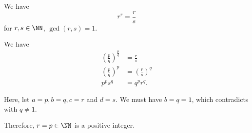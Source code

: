 \begin{enumerate}
          We have
          \[
              r^r = \frac{r}{s}
          \]
          for \(r, s \in \NN\), \(\gcd(r, s) = 1\).

          We have
          \begin{align*}
              \left(\frac{p}{q}\right)^{\frac{p}{q}} & = \frac{r}{s}                \\
              \left(\frac{p}{q}\right)^p             & = \left(\frac{r}{s}\right)^q \\
              p^p s^q                                & = q^p r^q.
          \end{align*}

          Here, let \(a = p, b = q, c = r\) and \(d = s\). We must have \(b = q = 1\), which contradicts with \(q \neq 1\).

          Therefore, \(r = p \in \NN\) is a positive integer.
\end{enumerate}